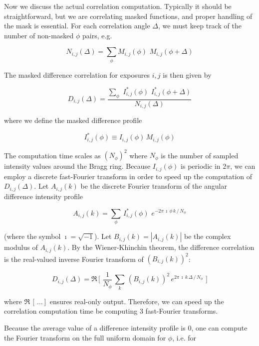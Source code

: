 \documentclass [12pt,fleqn]{article}
\def \be {\begin{equation}}
\def \ee {\end{equation}}
\begin{document}
Now we discuss the actual correlation computation. Typically it should be straightforward, but we are correlating masked functions, and proper handling of the mask is essential. For each correlation angle $\Delta$, we must keep track of the number of non-masked $\phi$ pairs, e.g. 

\begin{equation}
N_{i,j}(\Delta) = \sum\limits_{\phi} M_{i,j}(\phi)\,\,M_{i,j}(\phi + \Delta)
\end{equation}

The masked difference correlation for exposures $i,j$ is then given by 

\begin{equation}
D_{i,j}(\Delta) = 
\frac
{\sum\limits_{\phi}
\,\, I^*_{i,j}(\phi)
\,\, I^*_{i,j}(\phi+\Delta) }
{N_{i,j}(\Delta)}
\end{equation}

where we define the masked difference profile 

\begin{equation}
I^*_{i,j}(\phi) \equiv  I_{i,j}(\phi) \,M_{i,j}(\phi)
\end{equation}

The computation time scales as $(N_\phi)^2$ where $N_\phi$ is the number of sampled intensity values around the Bragg ring. Because $I_{i,j}(\phi)$ is periodic in $2\pi$, we can employ a discrete fast-Fourier transform in order to speed up the computation of $D_{i,j}(\Delta)$. Let $A_{i,j}(k)$ be the discrete Fourier transform of the angular difference intensity profile

\be
A_{i,j}(k) = \sum_\phi \,I^*_{i,j}(\phi)  \,\,e^  {-2\pi \,\imath \,\phi\, k \,/\, N_\phi }
\ee 

(where the symbol $\imath = \sqrt{-1}$). Let $B_{i,j}(k) = |A_{i,j}(k) |$ be the complex modulus of $A_{i,j}(k)$. By the Wiener-Khinchin theorem, the difference correlation is the real-valued inverse Fourier transform of $\left( B_{i,j}(k) \right) ^2$:

\be
D_{i,j}(\Delta) = \mathfrak R\, \big[ \,\, \frac{1}{N_\phi}\,\sum_k \,\left(B_{i,j}(k)\right)^2  \,e^  {2\pi \,\imath \,k\,\Delta \,/\, N_\phi }\,\, \big]
\ee 

where $\mathfrak R \,[ \,\dots ]$ ensures real-only output. Therefore, we can speed up the correlation computation time be computing 3 fast-Fourier transforms. 

Because the average value of a difference intensity profile is $0$, one can compute the Fourier transform on the full uniform domain for $\phi$, i.e. for 
\end{document}
